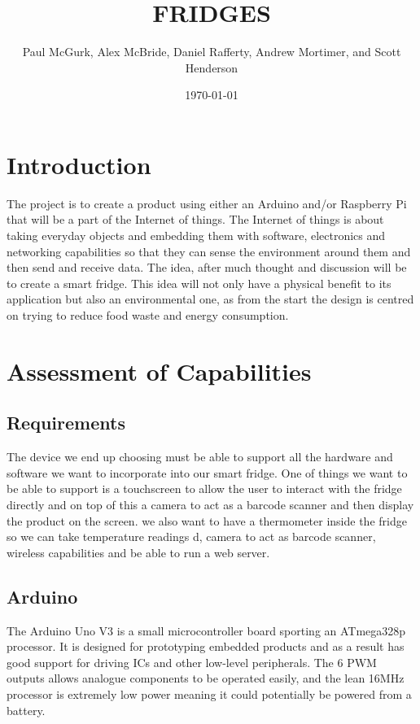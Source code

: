 \documentclass[10pt]{article}
\title{FRIDGES}
\author{Paul McGurk, Alex McBride, Daniel Rafferty, Andrew Mortimer, and Scott Henderson}
\date{\today}
\begin{document}
\begin{titlepage}
\maketitle
\end{titlepage}

\linespread{1.15} %
\renewcommand{\arraystretch}{1.2} %

\tableofcontents

\newpage
\section{Introduction}

The project is to create a product using either an Arduino and/or Raspberry Pi that will be a part of the Internet of things. The Internet of things is about taking everyday objects and embedding them with software, electronics and networking capabilities so that they can sense the environment around them and then send and receive data. The idea, after much thought and discussion will be to create a smart fridge. This idea will not only have a physical benefit to its application but also an environmental one, as from the start the design is centred on trying to reduce food waste and energy consumption.

\newpage
\section{Assessment of Capabilities}

\subsection{Requirements}

The device we end up choosing must be able to support all the hardware and software we want to incorporate into our smart fridge. One of things we want to be able to support is a touchscreen to allow the user to interact with the fridge directly and on top of this a camera to act as a barcode scanner and then display the product on the screen. we also want to have a thermometer inside the fridge so we can take temperature readings d, camera to act as barcode scanner, wireless capabilities and be able to run a web server.

\subsection{Arduino}
The Arduino Uno V3 is a small microcontroller board sporting an ATmega328p processor. It is designed for prototyping embedded products and as a result has good support for driving ICs and other low-level peripherals. The 6 PWM outputs allows analogue components to be operated easily, and the lean 16MHz processor is extremely low power meaning it could potentially be powered from a battery.
\end{document}
